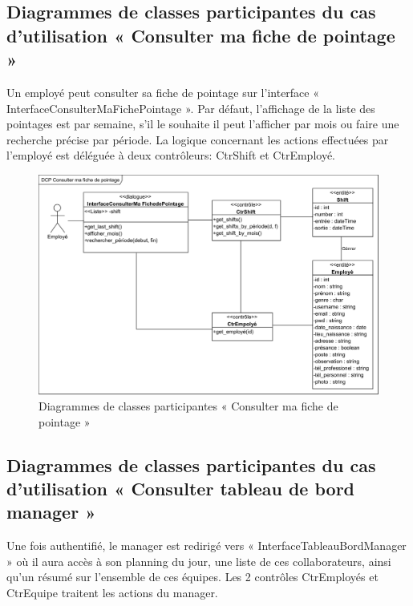 \subsection*{Diagrammes de classes participantes du cas d'utilisation « Consulter ma fiche de pointage »}
Un employé peut consulter sa fiche de pointage sur l’interface «
InterfaceConsulterMaFichePointage ». Par défaut, l’affichage de la liste des
pointages est par semaine, s’il le souhaite il peut l’afficher par mois ou faire
une recherche précise par période. La logique concernant les actions effectuées
par l’employé est déléguée à deux contrôleurs: CtrShift et CtrEmployé.
            
\begin{figure}[h!]
    \centering
    \includegraphics[scale=0.72]{images/DCP/DCP Consulter ma fiche de pointage.png}
    \caption{Diagrammes de classes participantes « Consulter ma fiche de pointage »}
    \label{fig26}
\end{figure}
            
\subsection*{Diagrammes de classes participantes du cas d'utilisation « Consulter tableau de bord manager »}
Une fois authentifié, le manager est redirigé vers 
« InterfaceTableauBordManager » où il aura accès à son planning du jour, une 
liste de ces collaborateurs, ainsi qu’un résumé sur l’ensemble de ces équipes. 
Les 2 contrôles CtrEmployés et CtrEquipe traitent les actions du manager. 

